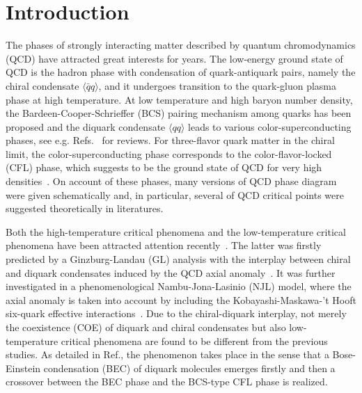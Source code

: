 \documentclass[prd, showpacs,nofootinbib,amsmath,amssymb,12pt]{revtex4}
\begin{document}
\section{Introduction}
The phases of strongly interacting matter described by quantum chromodynamics (QCD) have attracted great interests for years.
The low-energy ground state of QCD is the hadron phase with condensation of quark-antiquark pairs,
namely the chiral condensate $\langle\bar{q}q\rangle$, and it undergoes transition to the quark-gluon plasma phase at high temperature.
At low temperature and high baryon number density,
the Bardeen-Cooper-Schrieffer (BCS) pairing mechanism among quarks has been proposed and the diquark condensate $\langle qq\rangle$ leads to various color-superconducting phases, see e.g. Refs.~\cite{alford2004dense,alford1998qcd} for reviews.
For three-flavor quark matter in the chiral limit, the color-superconducting phase corresponds to the color-flavor-locked (CFL) phase,
which suggests to be the ground state of QCD for very high densities~\cite{alford1998qcd}.
On account of these phases, many versions of QCD phase diagram were given schematically and,
in particular, several of QCD critical points were suggested theoretically in literatures.

Both the high-temperature critical phenomena and the low-temperature critical phenomena have been attracted attention recently~\cite{}.
The latter was firstly predicted by a Ginzburg-Landau (GL) analysis with the interplay between chiral and
diquark condensates induced by the QCD axial anomaly~\cite{yamamoto2007phase}.
It was further investigated in a phenomenological Nambu-Jona-Lasinio (NJL) model,
where the axial anomaly is taken into account by including the Kobayashi-Maskawa-'t Hooft six-quark effective interactions~\cite{abuki2010nambu}.
Due to the chiral-diquark interplay,
not merely the coexistence (COE) of diquark and chiral condensates but also low-temperature critical phenomena are found to be different from the previous studies.
As detailed in Ref.\cite{abuki2010nambu},
the phenomenon takes place in the sense that a Bose-Einstein condensation (BEC) of diquark molecules emerges firstly
and then a crossover between the BEC phase and the BCS-type CFL phase is realized.
\end{document}
